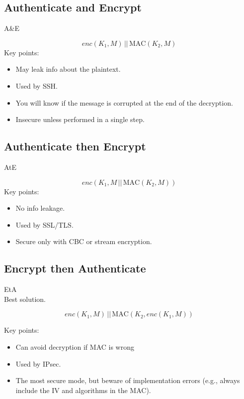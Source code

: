     \begin{multicols}{2}

        \subsection*{Authenticate and Encrypt}
    \begin{center}
        A\&E
    \end{center}
    \[
        enc(K_1, M) \, || \, \text{MAC}(K_2, M)
    \]
    Key points:
    \begin{itemize}
        \item May leak info about the plaintext.
        \item Used by SSH.
        \item You will know if the message is corrupted at the end of the decryption.
        \item Insecure unless performed in a single step.
    \end{itemize}
\columnbreak

    \subsection*{Authenticate then Encrypt}
    \begin{center}
        AtE
    \end{center}
    \[
        enc(K_1, M \, || \, \text{MAC}(K_2, M))
    \]
    Key points:
    \begin{itemize}
        \item No info leakage.
        \item Used by SSL/TLS.
        \item Secure only with CBC or stream encryption.
    \end{itemize}
\end{multicols}

\begin{center}
    \subsection*{Encrypt then Authenticate}
    \begin{center}
        EtA \\ Best solution.
    \end{center}
    \[
        enc(K_1, M) \, || \, \text{MAC}(K_2, enc(K_1, M))
    \]
\end{center}

Key points:
\begin{itemize}
    \item Can avoid decryption if MAC is wrong
    \item Used by IPsec.
    \item The most secure mode, but beware of implementation errors (e.g., always include the  IV  and algorithms in the MAC).
\end{itemize}

